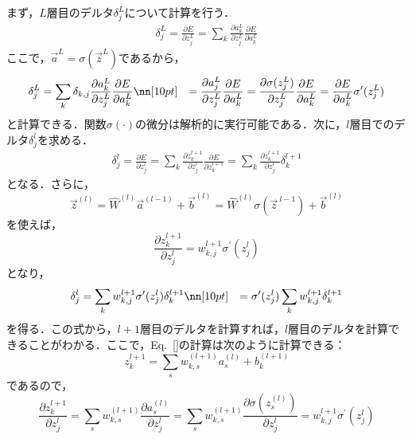 まず，$L$層目のデルタ$\delta^{L}_j$について計算を行う．
\begin{align}
    \delta^{L}_{j}
    =\frac{\partial E}{\partial z^{L}_{j}}
    =\sum_{k}\frac{\partial a^{L}_{k}}{\partial z^{L}_{j}}
    \frac{\partial E}{\partial a^{L}_{k}}
\end{align}
ここで，$\vec{a}^{L}=\sigma(\vec{z}^{L})$であるから，
\begin{align}
    \delta^{L}_{j}
    &=\sum_{k}\delta_{k,j}\frac{\partial a^{L}_{k}}{\partial z^{L}_{j}}
    \frac{\partial E}{\partial a^{L}_{k}}\nn[10pt]
    &=\frac{\partial a^{L}_{j}}{\partial z^{L}_{j}}
    \frac{\partial E}{\partial a^{L}_{k}}
    =\frac{\partial \sigma(z^{L}_{j})}{\partial z^{L}_{j}}
    \frac{\partial E}{\partial a^{L}_{k}}
    =\frac{\partial E}{\partial a^{L}_{k}}\sigma^{\prime}(z_j^{L})
\end{align}
と計算できる．関数$\sigma(\cdot)$の微分は解析的に実行可能である．次に，$l$層目でのデルタ$\delta^{l}_{j}$を求める．
\begin{align}
    \delta^{l}_{j}
    =\frac{\partial E}{\partial z^{l}_{j}}
    =\sum_{k}\frac{\partial z^{l+1}_{k}}{\partial z^{l}_{j}}
    \frac{\partial E}{\partial z^{l+1}_{k}}
    =\sum_{k}\frac{\partial z^{l+1}_{k}}{\partial z^{l}_{j}}
    \delta^{l+1}_k
\end{align}
となる．さらに，
\begin{equation}
    \vec{z}^{(l)}
    =\hat{W}^{(l)} \vec{a}^{(l-1)} + \vec{b}^{(l)}
    =\hat{W}^{(l)} \sigma(\vec{z}^{\ l-1}) + \vec{b}^{(l)}
\end{equation}
を使えば，
\begin{equation}
    \frac{\partial z^{l+1}_{k}}{\partial z^{l}_{j}}
    =w^{l+1}_{k,j}\sigma^{\prime}(z_j^{l})
\end{equation}
となり，
\begin{align}
    \delta^{l}_{j}
    &=\sum_{k}w^{l+1}_{k,j}\sigma^{\prime}(z_j^{l})
    \delta^{l+1}_k\nn[10pt]
    &=\sigma^{\prime}(z_j^{l})\sum_{k}w^{l+1}_{k,j}
    \delta^{l+1}_k
\end{align}
を得る．この式から，$l+1$層目のデルタを計算すれば，$l$層目のデルタを計算できることがわかる．ここで，Eq.~\eqref{}の計算は次のように計算できる：
\begin{equation}
    z^{l+1}_{k} = \sum_{s}w^{(l+1)}_{k,s} a^{(l)}_{s} + b^{(l+1)}_{k}
\end{equation}
であるので，
\begin{equation}
    \frac{\partial z^{l+1}_k}{\partial z^{l}_{j}}
    = \sum_{s}w^{(l+1)}_{k,s} 
    \frac{\partial a^{(l)}_{s}}{\partial z^{l}_{j}}
    = \sum_{s}w^{(l+1)}_{k,s} 
    \frac{\partial \sigma(z^{(l)}_{s})}{\partial z^{l}_{j}}
    =w^{l+1}_{k,j}\sigma^{\prime}(z^{l}_j)
\end{equation}
